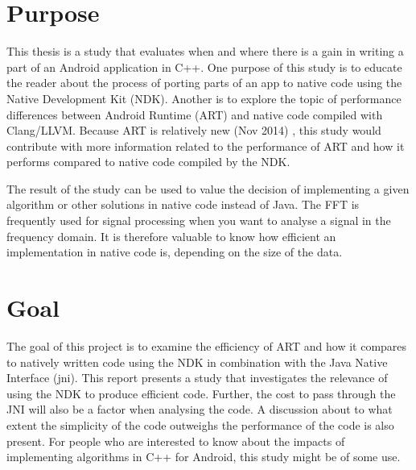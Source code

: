 \section{Purpose}
This thesis is a study that evaluates when and where there is a gain in writing a part of an Android application in C++. One purpose of this study is to educate the reader about the process of porting parts of an app to native code using the Native Development Kit (NDK). Another is to explore the topic of performance differences between Android Runtime (ART) and native code compiled with Clang/LLVM. Because ART is relatively new (Nov 2014) \cite{android:dalvik:release}, this study would contribute with more information related to the performance of ART and how it performs compared to native code compiled by the NDK.


The result of the study can be used to value the decision of implementing a given algorithm or other solutions in native code instead of Java. The FFT is frequently used for signal processing when you want to analyse a signal in the frequency domain. It is therefore valuable to know how efficient an implementation in native code is, depending on the size of the data.

% 

\section{Goal}
The goal of this project is to examine the efficiency of ART and how it compares to natively written code using the NDK in combination with the Java Native Interface (\gls{jni}). This report presents a study that investigates the relevance of using the NDK to produce efficient code. Further, the cost to pass through the JNI will also be a factor when analysing the code. A discussion about to what extent the simplicity of the code outweighs the performance of the code is also present. For people who are interested to know about the impacts of implementing algorithms in C++ for Android, this study might be of some use.

